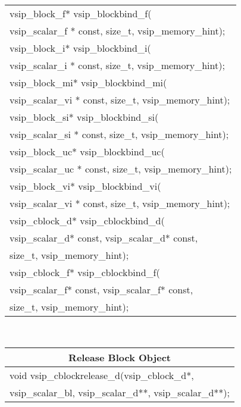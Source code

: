 {\begin{tabular}[H]{l}
vsip\_block\_f* vsip\_blockbind\_f(\\*\hspace{.7cm}vsip\_scalar\_f * const, size\_t, vsip\_memory\_hint);\\
vsip\_block\_i* vsip\_blockbind\_i(\\*\hspace{.7cm}vsip\_scalar\_i * const, size\_t, vsip\_memory\_hint);\\
vsip\_block\_mi* vsip\_blockbind\_mi(\\*\hspace{.7cm}vsip\_scalar\_vi * const, size\_t, vsip\_memory\_hint);\\
vsip\_block\_si* vsip\_blockbind\_si(\\*\hspace{.7cm}vsip\_scalar\_si * const, size\_t, vsip\_memory\_hint);\\
vsip\_block\_uc* vsip\_blockbind\_uc(\\*\hspace{.7cm}vsip\_scalar\_uc * const, size\_t, vsip\_memory\_hint);\\
vsip\_block\_vi* vsip\_blockbind\_vi(\\*\hspace{.7cm}vsip\_scalar\_vi * const, size\_t, vsip\_memory\_hint);\\
vsip\_cblock\_d* vsip\_cblockbind\_d(\\*\hspace{.7cm}vsip\_scalar\_d* const, vsip\_scalar\_d* const,\\*\hspace{.7cm}size\_t, vsip\_memory\_hint);\\
vsip\_cblock\_f* vsip\_cblockbind\_f(\\*\hspace{.7cm}vsip\_scalar\_f* const, vsip\_scalar\_f* const,\\*\hspace{.7cm}size\_t, vsip\_memory\_hint);\\
\end{tabular}\\
\begin{tabular}[H]{l}
\multicolumn{1}{c}{\rmfamily \bfseries Release Block Object\vspace{.1cm}}\\ \hline
void vsip\_cblockrelease\_d(vsip\_cblock\_d*,\\*\hspace{.7cm}vsip\_scalar\_bl, vsip\_scalar\_d**, vsip\_scalar\_d**);\\

\end{tabular}}
